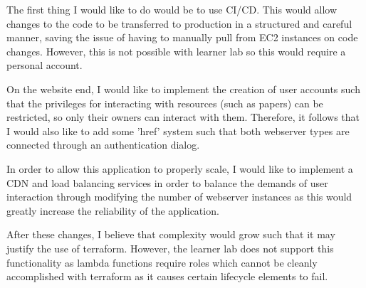 \documentclass[12pt]{article}
\begin{document}
The first thing I would like to do would be to use CI/CD. This would allow changes to the code to be transferred to production in a structured and careful manner, saving the issue of having to manually pull from EC2 instances on code changes. However, this is not possible with learner lab so this would require a personal account.

On the website end, I would like to implement the creation of user accounts such that the privileges for interacting with resources (such as papers) can be restricted, so only their owners can interact with them. Therefore, it follows that I would also like to add some 'href' system such that both webserver types are connected through an authentication dialog. 

In order to allow this application to properly scale, I would like to implement a CDN and load balancing services in order to balance the demands of user interaction through modifying the number of webserver instances as this would greatly increase the reliability of the application. 

After these changes, I believe that complexity would grow such that it may justify the use of terraform. However, the learner lab does not support this functionality as lambda functions require roles which cannot be cleanly accomplished with terraform as it causes certain lifecycle elements to fail. 
\end{document}
